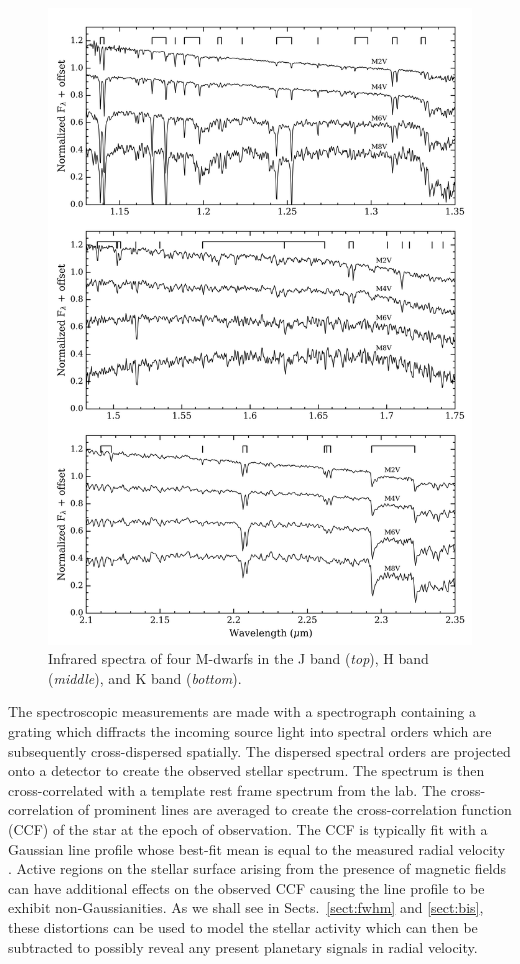\begin{figure}
\centering
\includegraphics[scale=0.7]{figures/Mdwarf_spectra.png}
\caption{Infrared spectra of four M-dwarfs in the J band (\emph{top}), H band 
(\emph{middle}), and K band (\emph{bottom}). \label{fig:spectra}}
\end{figure}

The spectroscopic measurements are made with a spectrograph containing a grating which 
diffracts the incoming source light into spectral orders which are subsequently 
cross-dispersed spatially. The dispersed spectral orders are projected onto a detector 
to create the observed stellar spectrum. The spectrum is then cross-correlated with a  
template rest frame spectrum from the lab. The cross-correlation of prominent lines 
are averaged to create the cross-correlation function (CCF) of the star at the epoch of 
observation. The CCF is typically fit with a Gaussian line profile whose best-fit mean 
is equal to the measured radial velocity \parencite{pepe02}. 
Active regions on the stellar surface arising 
from the presence of magnetic fields can have additional effects on the observed CCF 
causing the line profile to be exhibit non-Gaussianities. 
As we shall see in Sects.~\ref{sect:fwhm} and \ref{sect:bis}, these distortions can 
be used to model the stellar activity which can then be subtracted to possibly reveal 
any present planetary signals in radial velocity.

